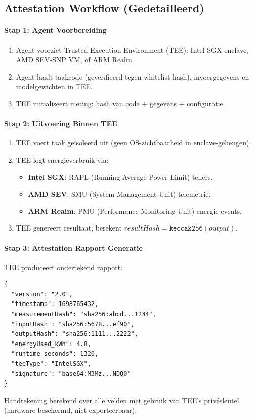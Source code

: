 \documentclass[11pt]{article}
\begin{document}
\subsection{Attestation Workflow (Gedetailleerd)}
\label{sec:attestation-workflow}
\paragraph{Stap 1: Agent Voorbereiding}
\begin{enumerate}[noitemsep]
  \item Agent voorziet Trusted Execution Environment (TEE): Intel SGX enclave, AMD SEV-SNP VM, of ARM Realm.
  \item Agent laadt taakcode (geverifieerd tegen whitelist hash), invoergegevens en modelgewichten in TEE.
  \item TEE initialiseert meting: hash van code + gegevens + configuratie.
\end{enumerate}

\paragraph{Stap 2: Uitvoering Binnen TEE}
\begin{enumerate}[noitemsep]
  \item TEE voert taak geïsoleerd uit (geen OS-zichtbaarheid in enclave-geheugen).
  \item TEE logt energieverbruik via:
    \begin{itemize}[noitemsep]
      \item \textbf{Intel SGX}: RAPL (Running Average Power Limit) tellers.
      \item \textbf{AMD SEV}: SMU (System Management Unit) telemetrie.
      \item \textbf{ARM Realm}: PMU (Performance Monitoring Unit) energie-events.
    \end{itemize}
  \item TEE genereert resultaat, berekent $resultHash = \texttt{keccak256}(output)$.
\end{enumerate}

\paragraph{Stap 3: Attestation Rapport Generatie}
TEE produceert ondertekend rapport:
\begin{verbatim}
{
  "version": "2.0",
  "timestamp": 1698765432,
  "measurementHash": "sha256:abcd...1234",
  "inputHash": "sha256:5678...ef90",
  "outputHash": "sha256:1111...2222",
  "energyUsed_kWh": 4.8,
  "runtime_seconds": 1320,
  "teeType": "IntelSGX",
  "signature": "base64:M3Mz...NDQ0"
}
\end{verbatim}
Handtekening berekend over alle velden met gebruik van TEE's privésleutel (hardware-beschermd, niet-exporteerbaar).
\end{document}
